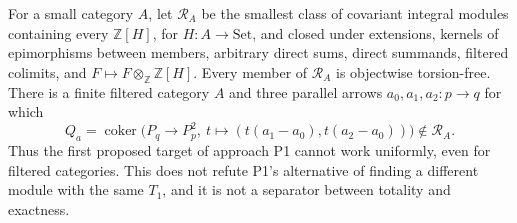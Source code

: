 \begin{proposition}
\label{A:P1-torsion}
For a small category $A$, let $\mathcal R_A$ be the smallest class of
covariant integral modules containing every $\mathbb Z[H]$, for
$H:A\to\mathrm{Set}$, and closed under extensions, kernels of
epimorphisms between members, arbitrary direct sums, direct summands,
filtered colimits, and $F\mapsto F\otimes_{\mathbb Z}\mathbb Z[H]$.
Every member of $\mathcal R_A$ is objectwise torsion-free.
There is a finite filtered category $A$ and three parallel arrows
$a_0,a_1,a_2:p\to q$ for which
\[
 Q_a=\operatorname{coker}\bigl(P_q\longrightarrow P_p^2,
             \ t\longmapsto(t(a_1-a_0),t(a_2-a_0))\bigr)
 \notin\mathcal R_A.
\]
Thus the first proposed target of approach P1 cannot work uniformly,
even for filtered categories.  This does not refute P1's alternative
of finding a different module with the same $T_1$, and it is not a
separator between totality and exactness.
\end{proposition}
